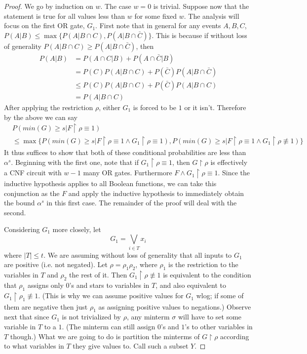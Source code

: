 \begin{proof}
	We go by induction on $w$. The case $w=0$ is trivial. Suppose now that the statement is true for all values less than $w$ for some fixed $w$. The analysis will focus on the first OR gate, $G_1$.  First note that in general for any events $A,B,C$, $P(A|B) \leq \max\{P(A|B\cap C),P(A|B \cap \bar{C})\}$. This is because if without loss of generality $P(A|B \cap C) \geq P(A|B \cap \bar{C})$, then
	\begin{align*}
		P(A|B) &= P(A\cap C|B)+P(A \cap \bar{C}|B) \\
			&= P(C)P(A|B \cap C) + P(\bar{C})P(A|B\cap \bar{C}) \\
			&\leq P(C)P(A|B \cap C)+ P(\bar{C})P(A|B \cap C) \\
			&= P(A|B \cap C) 
	\end{align*}
After applying the restriction $\rho$, either $G_1$ is forced to be $1$ or it isn't. Therefore by the above we can say 
\begin{align*}
	 & P(min(G) \geq s | F \restriction \rho \equiv 1) \\
	 	&\leq \max\{P(min(G) \geq s | F \restriction \rho \equiv 1 \wedge G_1 \restriction \rho \equiv 1), P(min(G) \geq s | F\restriction \rho \equiv 1 \wedge G_1\restriction \rho \not\equiv 1)\}
\end{align*}
It thus suffices to show that both of these conditional probabilities are less than $\alpha^s$. Beginning with the first one, note that if $G_1 \restriction \rho \equiv 1$, then $G \restriction \rho$ is effectively a CNF circuit with $w-1$ many OR gates. Furthermore $F \wedge G_1 \restriction \rho \equiv 1$. Since the inductive hypothesis applies to all Boolean functions, we can take this conjunction as the $F$ and apply the inductive hypothesis to immediately obtain the bound $\alpha^s$ in this first case. The remainder of the proof will deal with the second. \par 
Considering $G_1$ more closely, let 
\[ G_1 = \bigvee_{i\in T} x_i \]
where $|T| \leq t$. We are assuming without loss of generality that all inputs to $G_1$ are positive (i.e. not negated). Let $\rho = \rho_1 \rho_2$, where $\rho_1$ is the restriction to the variables in $T$ and $\rho_2$ the rest of it. Then $G_1 \restriction \rho \not\equiv 1$ is equivalent to the condition that $\rho_1$ assigns only $0$'s and stars to variables in $T$, and also equivalent to $G_1 \restriction \rho_1 \not\equiv 1$. (This is why we can assume positive values for $G_1$ wlog; if some of them are negative then just $\rho_1$ as assigning positive values to negations.) Observe next that since $G_1$ is not trivialized by $\rho$, any minterm $\sigma$ will have to set some variable in $T$ to a $1$. (The minterm can still assign $0$'s and $1$'s to other variables in $T$ though.) What we are going to do is partition the minterms of $G\restriction \rho$ according to what variables in $T$ they give values to. Call such a subset $Y$. \par

\end{proof}
